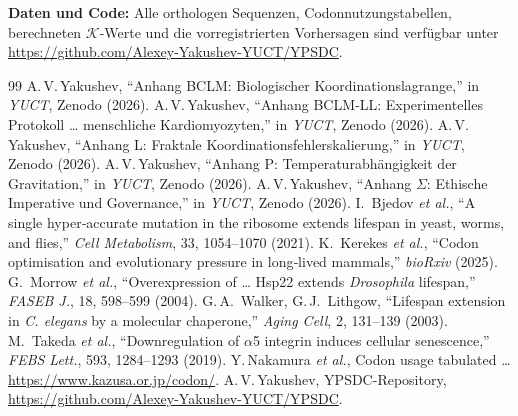 \documentclass[12pt,a4paper]{article}
\newcommand{\REL}{\mathcal{K}}          %
\begin{document}
	\vspace{0.5cm}
	\noindent\textbf{Daten und Code:} Alle orthologen Sequenzen, Codonnutzungstabellen, berechneten \(\REL\)-Werte und die vorregistrierten Vorhersagen sind verfügbar unter \url{https://github.com/Alexey-Yakushev-YUCT/YPSDC}.
	
	\begin{thebibliography}{99}
		 A.\,V.\,Yakushev, ``Anhang BCLM: Biologischer Koordinationslagrange,'' in \emph{YUCT}, Zenodo (2026).
		 A.\,V.\,Yakushev, ``Anhang BCLM‑LL: Experimentelles Protokoll … menschliche Kardiomyozyten,'' in \emph{YUCT}, Zenodo (2026).
		 A.\,V.\,Yakushev, ``Anhang L: Fraktale Koordinationsfehlerskalierung,'' in \emph{YUCT}, Zenodo (2026).
		 A.\,V.\,Yakushev, ``Anhang P: Temperaturabhängigkeit der Gravitation,'' in \emph{YUCT}, Zenodo (2026).
		 A.\,V.\,Yakushev, ``Anhang \(\Sigma\): Ethische Imperative und Governance,'' in \emph{YUCT}, Zenodo (2026).
		 I.~Bjedov \emph{et al.}, ``A single hyper‑accurate mutation in the ribosome extends lifespan in yeast, worms, and flies,'' \emph{Cell Metabolism}, 33, 1054–1070 (2021).
		 K.~Kerekes \emph{et al.}, ``Codon optimisation and evolutionary pressure in long‑lived mammals,'' \emph{bioRxiv} (2025).
		 G.~Morrow \emph{et al.}, ``Overexpression of … Hsp22 extends \textit{Drosophila} lifespan,'' \emph{FASEB J.}, 18, 598–599 (2004).
		 G.\,A.~Walker, G.\,J.~Lithgow, ``Lifespan extension in \textit{C. elegans} by a molecular chaperone,'' \emph{Aging Cell}, 2, 131–139 (2003).
		 M.~Takeda \emph{et al.}, ``Downregulation of \(\alpha\)5 integrin induces cellular senescence,'' \emph{FEBS Lett.}, 593, 1284–1293 (2019).
		 Y.\,Nakamura \emph{et al.}, Codon usage tabulated … \url{https://www.kazusa.or.jp/codon/}.
		 A.\,V.\,Yakushev, YPSDC-Repository, \url{https://github.com/Alexey-Yakushev-YUCT/YPSDC}.
	\end{thebibliography}
	
\end{document}
